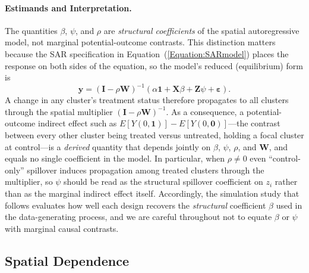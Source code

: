 \documentclass{article}[11pt]
\begin{document}
\paragraph{Estimands and Interpretation.}
The quantities $\beta$, $\psi$, and $\rho$ are \emph{structural coefficients} of the spatial autoregressive model, not marginal potential-outcome contrasts. This distinction matters because the SAR specification in Equation~(\ref{Equation:SARmodel}) places the response on both sides of the equation, so the model's reduced (equilibrium) form is
\begin{equation}\label{Equation:ReducedForm}
    \mathbf{y} = (\mathbf{I} - \rho\mathbf{W})^{-1}\left(\alpha\mathbf{1} + \mathbf{X}\beta + \mathbf{Z}\psi + \boldsymbol{\varepsilon}\right).
\end{equation}
A change in any cluster's treatment status therefore propagates to all clusters through the spatial multiplier $(\mathbf{I} - \rho\mathbf{W})^{-1}$. As a consequence, a potential-outcome indirect effect such as $E[Y(0,\mathbf{1})] - E[Y(0,\mathbf{0})]$---the contrast between every other cluster being treated versus untreated, holding a focal cluster at control---is a \emph{derived} quantity that depends jointly on $\beta$, $\psi$, $\rho$, and $\mathbf{W}$, and equals no single coefficient in the model. In particular, when $\rho \neq 0$ even ``control-only'' spillover induces propagation among treated clusters through the multiplier, so $\psi$ should be read as the structural spillover coefficient on $z_i$ rather than as the marginal indirect effect itself. Accordingly, the simulation study that follows evaluates how well each design recovers the \emph{structural} coefficient $\beta$ used in the data-generating process, and we are careful throughout not to equate $\beta$ or $\psi$ with marginal causal contrasts.

\subsection{Spatial Dependence}\label{section:SpatialWeightsMatrix}
\end{document}
